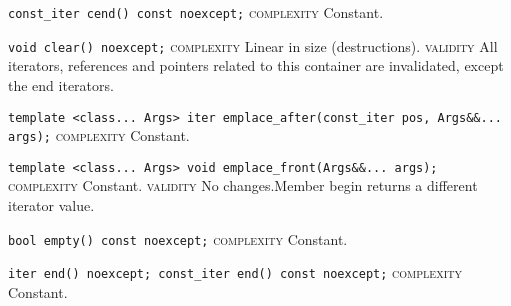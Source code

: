 \noindent{}\hspace*{0.25em}\lstinline[basicstyle=\ttfamily\color{cgreen}]{const_iter cend() const noexcept;} \textsc{complexity} Constant.\\\vspace{-0.6em}

\noindent{}\hspace*{0.25em}\lstinline[basicstyle=\ttfamily\color{corange}]{void clear() noexcept;} \textsc{complexity} Linear in size (destructions). \textsc{validity} All iterators, references and pointers related to this container are invalidated, except the end iterators.\\\vspace{-0.6em}

\noindent{}\hspace*{0.25em}\lstinline[basicstyle=\ttfamily\color{cgreen}]{template <class... Args> iter emplace_after(const_iter pos, Args&&... args);} \textsc{complexity} Constant.\\\vspace{-0.6em}

\noindent{}\hspace*{0.25em}\lstinline[basicstyle=\ttfamily\color{cgreen}]{template <class... Args> void emplace_front(Args&&... args);} \textsc{complexity} Constant. \textsc{validity} No changes.Member begin returns a different iterator value.\\\vspace{-0.6em}

\noindent{}\hspace*{0.25em}\lstinline[basicstyle=\ttfamily\color{cgreen}]{bool empty() const noexcept;} \textsc{complexity} Constant.\\\vspace{-0.6em}

\noindent{}\hspace*{0.25em}\lstinline[basicstyle=\ttfamily\color{cgreen}]{iter end() noexcept; const_iter end() const noexcept;} \textsc{complexity} Constant.\\\vspace{-0.6em}

